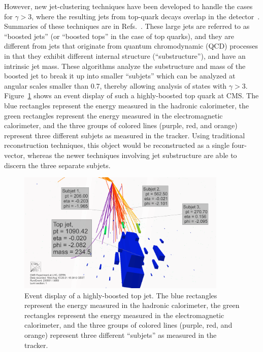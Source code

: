 \documentclass[12pt]{proposalnsf}
\begin{document}
However, new jet-clustering techniques have been developed to handle
the cases for $\gamma > 3$, where the resulting jets from top-quark
decays overlap in the
detector~\cite{Seymour:1993mx,boostedhiggs,catop_theory,catop_cms,jetpruning1,jetpruning2,nsub,heptoptagger,trimming}.
Summaries of these techniques are in Refs.~\cite{boost2010,boost2011}.
These
large jets are referred to as 
``boosted jets'' (or ``boosted tops'' in the case of top quarks), and
they are
different from jets that originate from quantum chromodynamic (QCD)
processes in that they exhibit different internal structure
(``substructure''), and have an intrinsic jet mass. 
These algorithms
analyze the substructure and mass
of the boosted jet to break it up into smaller ``subjets'' which can be
analyzed at angular scales smaller than 0.7, thereby allowing analysis
of states with $\gamma > 3$. Figure~\ref{boostedtop_eventdisplay}
shows an event display of such a highly-boosted top quark at CMS. 
The blue rectangles represent the
energy measured in the hadronic calorimeter, the green
rectangles represent the energy measured in the electromagnetic
calorimeter, and the three groups of colored lines (purple, red,
and orange) represent three different subjets as measured in
the tracker. Using traditional reconstruction techniques, this object
would be reconstructed as a single four-vector, whereas the newer
techniques involving jet substructure are able to discern the three
separate subjets. 


\begin{figure}[h!]
    \centering
    \includegraphics[width=100mm]{topjet_rechits_white}
    \caption{\label{boostedtop_eventdisplay} Event display of a
      highly-boosted top jet. The blue rectangles represent the
      energy measured in the hadronic calorimeter, the green
      rectangles represent the energy measured in the electromagnetic
      calorimeter, and the three groups of colored lines (purple, red,
      and orange) represent three different ``subjets'' as measured in
      the tracker.}
\end{figure}
\end{document}
